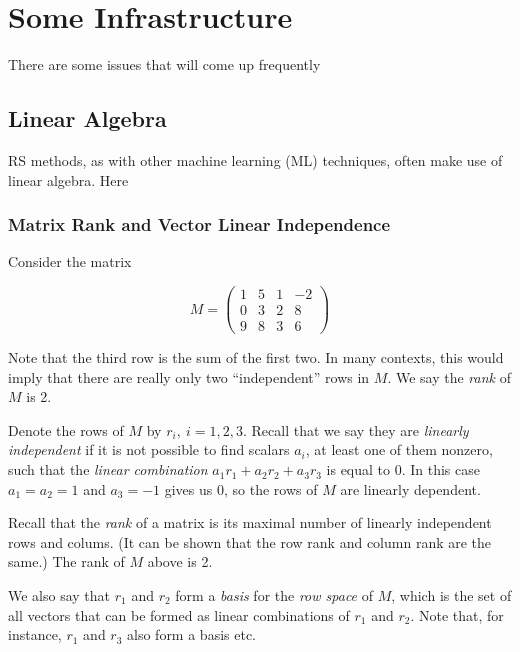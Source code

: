 \chapter{Some Infrastructure}
\label{chap:infra} 

There are some issues that will come up frequently

\section{Linear Algebra}

RS methods, as with other machine learning (ML) techniques, often make
use of linear algebra. Here

\subsection{Matrix Rank and Vector Linear Independence}

Consider the matrix

\begin{equation}
M = 
\left (
\begin{array}{rrrr}
1 & 5 & 1 & -2\\
0 & 3 & 2 & 8\\
9 & 8 & 3 & 6 
\end{array}
\right )
\end{equation}

Note that the third row is the sum of the first two.  In many contexts,
this would imply that there are really only two ``independent'' rows in
$M$.  We say the \textit{rank} of $M$ is 2.

Denote the rows of $M$ by $r_i, ~ i = 1,2,3$.  Recall that we say they
are \textit{linearly independent} if it is not possible to find scalars
$a_i$, at least one of them nonzero, such that the \textit{linear
combination} $a_1 r_1 + a_2 r_2 + a_3 r_3$ is equal to 0.  In this case
$a_1 = a_2 = 1$ and $a_3 = -1$ gives us 0, so the rows of $M$ are
linearly dependent.

Recall that the \textit{rank} of a matrix is its maximal number of
linearly independent rows and colums.  (It can be shown that the row
rank and column rank are the same.)  The rank of $M$ above is 2.

We also say that $r_1$ and $r_2$ form a \textit{basis} for the
\textit{row space} of $M$, which is the set of all vectors that can be
formed as linear combinations of $r_1$ and $r_2$.  Note that, for
instance,  $r_1$ and $r_3$ also form a basis etc.




